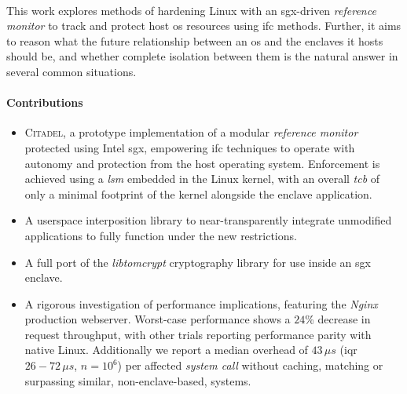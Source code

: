 \paragraph{} This work explores methods of hardening Linux with an \acrshort{sgx}-driven \textit{reference monitor} to track and protect host \acrshort{os} resources using \acrshort{ifc} methods. Further, it aims to reason what the future relationship between an \acrshort{os} and the enclaves it hosts should be, and whether complete isolation between them is the natural answer in several common situations.

\newpage
\paragraph{Contributions}
\begin{itemize}
    \item \textsc{Citadel}, a prototype implementation of a modular \textit{reference monitor} protected using Intel \acrshort{sgx}, empowering \acrshort{ifc} techniques to operate with autonomy and protection from the host operating system. Enforcement is achieved using a \textit{\acrfull{lsm}} embedded in the Linux kernel, with an overall \textit{\acrshort{tcb}} of only a minimal footprint of the kernel alongside the enclave application.
    \item A userspace interposition library to near-transparently integrate unmodified applications to fully function under the new restrictions.
    \item A full port of the \textit{libtomcrypt} cryptography library for use inside an \acrshort{sgx} enclave.
    \item A rigorous investigation of performance implications, featuring the \textit{Nginx} production webserver. Worst-case performance shows a $24$\% decrease in request throughput, with other trials reporting performance parity with native Linux. Additionally we report a median overhead of $43\,\mu s$ (\acrshort{iqr} $26-72\,\mu s$, $n = 10^6$) per affected \textit{system call} without caching, matching or surpassing similar, non-enclave-based, systems.
\end{itemize}